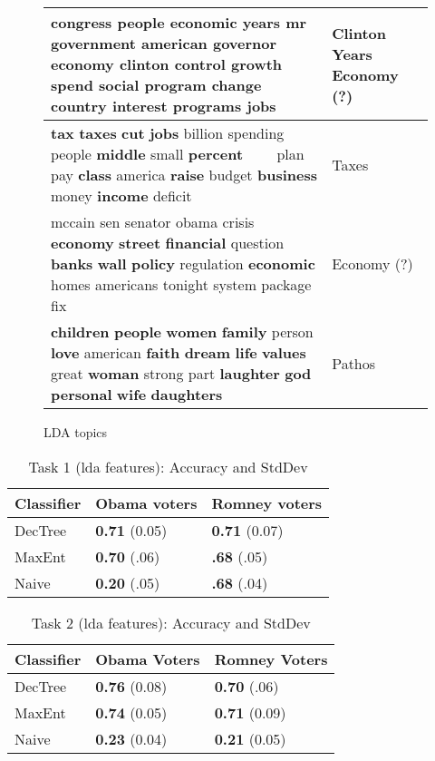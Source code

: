 \begin{figure*}
\begin{flushleft}
\begin{supertabular}{|m{4.8087597in}|m{1.1906599in}|}
{ congress people economic years mr government american governor economy clinton control growth
spend social program change country interest programs jobs} &
{ Clinton Years Economy (?)}\\\hline
{ \textbf{tax} \textbf{taxes} \textbf{cut} \textbf{jobs} billion spending people \textbf{middle}
small \textbf{percent} \ \ \ \ plan pay \textbf{class} america \textbf{raise} budget \textbf{business} money
\textbf{income} deficit} &
{ Taxes}\\\hline
{ mccain sen senator obama crisis \textbf{economy} \textbf{street} \textbf{financial} question
\textbf{banks} \textbf{wall} \textbf{policy} regulation \textbf{economic} homes americans tonight system package fix} &
{ Economy (?)}\\\hline
{ \textbf{children} \textbf{people} \textbf{women} \textbf{family} person \textbf{love} american
\textbf{faith} \textbf{dream} \textbf{life} \textbf{values} great \textbf{woman} strong part \textbf{laughter}
\textbf{god} \textbf{personal} \textbf{wife} \textbf{daughters}} &
{ Pathos}\\\hline
\end{supertabular}
\end{flushleft}
\caption{LDA topics}
\label{fig:ldatopics}
\end{figure*}

\begin{table}[H]
\begin{centering}
\begin{tabular}{ l | l | l }
Classifier & Obama voters & Romney voters \\
\hline
DecTree & \textbf{0.71} (0.05) &  \textbf{0.71} (0.07) \\
MaxEnt & \textbf{0.70} (.06) &  \textbf{.68} (.05) \\
Naive & \textbf{0.20} (.05) &  \textbf{.68} (.04) \\
\end{tabular}
\caption{Task 1 (lda features): Accuracy and StdDev}
\label{tab:task1lda}
\end{centering}
\end{table}

\begin{table}[H]
\begin{centering}
\begin{tabular}{ l | l | l }
Classifier & Obama Voters & Romney Voters \\
\hline
DecTree & \textbf{0.76} (0.08) &  \textbf{0.70} (.06) \\
MaxEnt & \textbf{0.74} (0.05) &  \textbf{0.71} (0.09) \\
Naive & \textbf{0.23} (0.04) &  \textbf{0.21} (0.05) \\
\end{tabular}
\caption{Task 2 (lda features): Accuracy and StdDev}
\label{tab:task2lda}
\end{centering}
\end{table}

